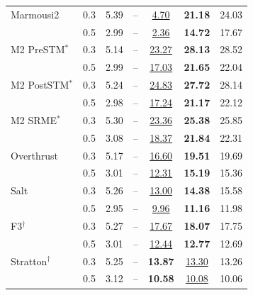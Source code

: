 \begin{table}[!t]
{\begin{tabular}{llccccc}
Marmousi2 & 0.3 & 5.39 & -- & \underline{4.70} & \textbf{21.18} & 24.03 \\
 & 0.5 & 2.99 & -- & \underline{2.36} & \textbf{14.72} & 17.67 \\
M2 PreSTM$^\ast$ & 0.3 & 5.14 & -- & \underline{23.27} & \textbf{28.13} & 28.52 \\
 & 0.5 & 2.99 & -- & \underline{17.03} & \textbf{21.65} & 22.04 \\
M2 PostSTM$^\ast$ & 0.3 & 5.24 & -- & \underline{24.83} & \textbf{27.72} & 28.14 \\
 & 0.5 & 2.98 & -- & \underline{17.24} & \textbf{21.17} & 22.12 \\
M2 SRME$^\ast$ & 0.3 & 5.30 & -- & \underline{23.36} & \textbf{25.38} & 25.85 \\
 & 0.5 & 3.08 & -- & \underline{18.37} & \textbf{21.84} & 22.31 \\
Overthrust & 0.3 & 5.17 & -- & \underline{16.60} & \textbf{19.51} & 19.69 \\
 & 0.5 & 3.01 & -- & \underline{12.31} & \textbf{15.19} & 15.36 \\
Salt & 0.3 & 5.26 & -- & \underline{13.00} & \textbf{14.38} & 15.58 \\
 & 0.5 & 2.95 & -- & \underline{9.96} & \textbf{11.16} & 11.98 \\
F3$^\dagger$ & 0.3 & 5.27 & -- & \underline{17.67} & \textbf{18.07} & 17.75 \\
 & 0.5 & 3.01 & -- & \underline{12.44} & \textbf{12.77} & 12.69 \\
Stratton$^\dagger$ & 0.3 & 5.25 & -- & \textbf{13.87} & \underline{13.30} & 13.26 \\
 & 0.5 & 3.12 & -- & \textbf{10.58} & \underline{10.08} & 10.06 \\
\bottomrule
\end{tabular}}
\end{table}
